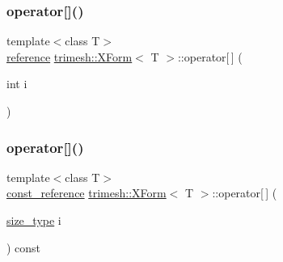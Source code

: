 \mbox{\label{classtrimesh_1_1XForm_a1957b360b9cfde140d24240229d04df8}} 
\subsubsection{\texorpdfstring{operator[]()}{operator[]()}\hspace{0.1cm}{\footnotesize\ttfamily [2/4]}}
{\footnotesize\ttfamily template$<$class T$>$ \\
\hyperlink{classtrimesh_1_1XForm_afef5285ff7d9ea2e25a4bb4d966bd674}{reference} \hyperlink{classtrimesh_1_1XForm}{trimesh\+::\+X\+Form}$<$ T $>$\+::operator\mbox{[}$\,$\mbox{]} (\begin{DoxyParamCaption}\item[{int}]{i }\end{DoxyParamCaption})\hspace{0.3cm}{\ttfamily [inline]}}

\mbox{\label{classtrimesh_1_1XForm_aea70c903539f3d6411a5195bee088f7a}} 
\subsubsection{\texorpdfstring{operator[]()}{operator[]()}\hspace{0.1cm}{\footnotesize\ttfamily [3/4]}}
{\footnotesize\ttfamily template$<$class T$>$ \\
\hyperlink{classtrimesh_1_1XForm_a33bd450d8902f70aaf7d4bf9fec01502}{const\+\_\+reference} \hyperlink{classtrimesh_1_1XForm}{trimesh\+::\+X\+Form}$<$ T $>$\+::operator\mbox{[}$\,$\mbox{]} (\begin{DoxyParamCaption}\item[{\hyperlink{classtrimesh_1_1XForm_aa219f141417c9026a74dec8b6279d4bf}{size\+\_\+type}}]{i }\end{DoxyParamCaption}) const\hspace{0.3cm}{\ttfamily [inline]}}

\mbox{\label{classtrimesh_1_1XForm_a2acbff85e341435ee5783659d97e3975}} 
